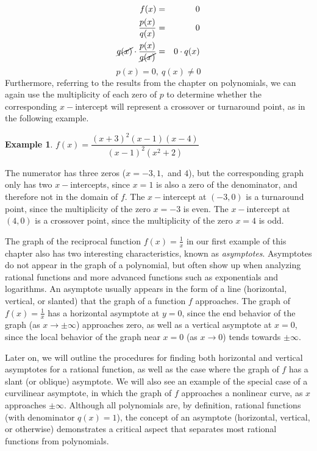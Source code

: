 \documentclass[12pt]{book}
\theoremstyle{definition}
\newtheorem{example}{Example}
\begin{document}
\begin{eqnarray*}
 f(x) & = & 0\\
\dfrac{p(x)}{q(x)} & = & 0\\
\cancel{q(x)}\cdot\dfrac{p(x)}{\cancel{q(x)}} & = & 0\cdot q(x)
\end{eqnarray*}
$$p(x) = 0, ~ q(x)\neq 0$$
Furthermore, referring to the results from the chapter on polynomials, we can again use the multiplicity of each zero of $p$ to determine whether the corresponding $x-$intercept will represent a crossover or turnaround point, as in the following example.
\begin{example}
$f(x)=\dfrac{(x+3)^2(x-1)(x-4)}{(x-1)^2(x^2+2)}$
\par
The numerator has three zeros ($x=-3,1,$ and $4$), but the corresponding graph only has two $x-$intercepts, since $x=1$ is also a zero of the denominator, and therefore not in the domain of $f$.  The $x-$intercept at $(-3,0)$ is a turnaround point, since the multiplicity of the zero $x=-3$ is even.  The $x-$intercept at $(4,0)$ is a crossover point, since the multiplicity of the zero $x=4$ is odd.
\end{example}
The graph of the reciprocal function $f(x)=\frac{1}{x}$ in our first example of this chapter also has two interesting characteristics, known as {\it asymptotes}.  Asymptotes do not appear in the graph of a polynomial, but often show up when analyzing rational functions and more advanced functions such as exponentials and logarithms.  An asymptote usually appears in the form of a line (horizontal, vertical, or slanted) that the graph of a function $f$ approaches.  The graph of $f(x)=\frac{1}{x}$ has a horizontal asymptote at $y=0$, since the end behavior of the graph (as $x\rightarrow \pm\infty$) approaches zero, as well as a vertical asymptote at $x=0$, since the local behavior of the graph near $x=0$ (as $x\rightarrow 0$) tends towards $\pm\infty$.
\par
Later on, we will outline the procedures for finding both horizontal and vertical asymptotes for a rational function, as well as the case where the graph of $f$ has a slant (or oblique) asymptote.  We will also see an example of the special case of a curvilinear asymptote, in which the graph of $f$ approaches a nonlinear curve, as $x$ approaches $\pm\infty$.  Although all polynomials are, by definition, rational functions (with denominator $q(x)=1$), the concept of an asymptote (horizontal, vertical, or otherwise) demonstrates a critical aspect that separates most rational functions from polynomials.
\end{document}
